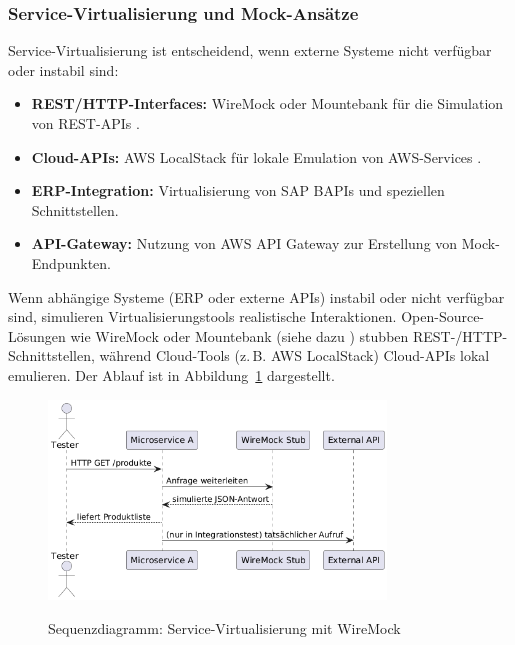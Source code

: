 \subsubsection{Service-Virtualisierung und Mock-Ansätze}
Service-Virtualisierung ist entscheidend, wenn externe Systeme nicht verfügbar oder instabil sind:
\begin{itemize}
    \item \textbf{REST/HTTP-Interfaces:} WireMock oder Mountebank für die Simulation von REST-APIs \cite{wiremock2025}.
    \item \textbf{Cloud-APIs:} AWS LocalStack für lokale Emulation von AWS-Services \cite{aws2021}.
    \item \textbf{ERP-Integration:} Virtualisierung von SAP BAPIs und speziellen Schnittstellen.
    \item \textbf{API-Gateway:} Nutzung von AWS API Gateway zur Erstellung von Mock-Endpunkten.
\end{itemize}
Wenn abhängige Systeme (ERP oder externe APIs) instabil oder nicht verfügbar sind, simulieren Virtualisierungstools realistische Interaktionen. Open-Source-Lösungen wie WireMock oder Mountebank (siehe dazu \citet{byars2018}) stubben REST-/HTTP-Schnittstellen, während Cloud-Tools (z.\,B. AWS LocalStack) Cloud-APIs lokal emulieren. Der Ablauf ist in Abbildung~\ref{fig:sequence} dargestellt.\begin{figure}[h!]
\centering
\caption{Sequenzdiagramm: Service-Virtualisierung mit WireMock}
    \includegraphics[width=0.8\textwidth]{fig/servicevirti.png}
    \label{fig:sequence}
\end{figure}

\newpage
